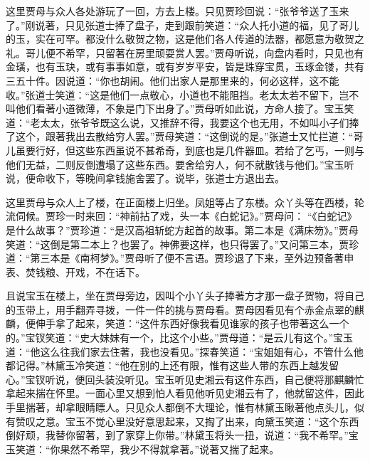 \begin{parag}


    这里贾母与众人各处游玩了一回，方去上楼。只见贾珍回说：“张爷爷送了玉来了。”刚说著，只见张道士捧了盘子，走到跟前笑道：“众人托小道的福，见了哥儿的玉，实在可罕。都没什么敬贺之物，这是他们各人传道的法器，都愿意为敬贺之礼。哥儿便不希罕，只留著在房里顽耍赏人罢。”贾母听说，向盘内看时，只见也有金璜，也有玉玦，或有事事如意，或有岁岁平安，皆是珠穿宝贯，玉琢金镂，共有三五十件。因说道：“你也胡闹。他们出家人是那里来的，何必这样，这不能收。”张道士笑道：“这是他们一点敬心，小道也不能阻挡。老太太若不留下，岂不叫他们看著小道微薄，不象是门下出身了。”贾母听如此说，方命人接了。宝玉笑道：“老太太，张爷爷既这么说，又推辞不得，我要这个也无用，不如叫小子们捧了这个，跟著我出去散给穷人罢。”贾母笑道：“这倒说的是。”张道士又忙拦道：“哥儿虽要行好，但这些东西虽说不甚希奇，到底也是几件器皿。若给了乞丐，一则与他们无益，二则反倒遭塌了这些东西。要舍给穷人，何不就散钱与他们。”宝玉听说，便命收下，等晚间拿钱施舍罢了。说毕，张道士方退出去。
\end{parag}


\begin{parag}


    这里贾母与众人上了楼，在正面楼上归坐。凤姐等占了东楼。众丫头等在西楼，轮流伺候。贾珍一时来回：“神前拈了戏，头一本《白蛇记》。”贾母问： “《白蛇记》是什么故事？”贾珍道：“是汉高祖斩蛇方起首的故事。第二本是《满床笏》。”贾母笑道：“这倒是第二本上？也罢了。神佛要这样，也只得罢了。”又问第三本，贾珍道：“第三本是《南柯梦》。”贾母听了便不言语。贾珍退了下来，至外边预备著申表、焚钱粮、开戏，不在话下。
\end{parag}


\begin{parag}


    且说宝玉在楼上，坐在贾母旁边，因叫个小丫头子捧著方才那一盘子贺物，将自己的玉带上，用手翻弄寻拨，一件一件的挑与贾母看。贾母因看见有个赤金点翠的麒麟，便伸手拿了起来，笑道：“这件东西好像我看见谁家的孩子也带著这么一个的。”宝钗笑道：“史大妹妹有一个，比这个小些。”贾母道：“是云儿有这个。”宝玉道：“他这么往我们家去住著，我也没看见。”探春笑道：“宝姐姐有心，不管什么他都记得。”林黛玉冷笑道：“他在别的上还有限，惟有这些人带的东西上越发留心。”宝钗听说，便回头装没听见。宝玉听见史湘云有这件东西，自己便将那麒麟忙拿起来揣在怀里。一面心里又想到怕人看见他听见史湘云有了，他就留这件，因此手里揣著，却拿眼睛瞟人。只见众人都倒不大理论，惟有林黛玉瞅著他点头儿，似有赞叹之意。宝玉不觉心里没好意思起来，又掏了出来，向黛玉笑道：“这个东西倒好顽，我替你留著，到了家穿上你带。”林黛玉将头一扭，说道：“我不希罕。”宝玉笑道：“你果然不希罕，我少不得就拿著。”说著又揣了起来。
\end{parag}



